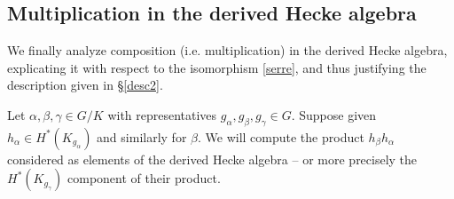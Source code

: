 \documentclass[10pt]{amsart}
\theoremstyle{remark}
\begin{document}
 
 
%
%
%
%
%
%
%
%
%
%

 
 


 
 
 
 
 
  \subsection{Multiplication in the derived Hecke algebra}  \label{sec:mult}
  We finally analyze composition (i.e. multiplication) in the derived Hecke algebra, explicating
  it with respect to the isomorphism \eqref{serre}, and thus justifying the description given in \S \ref{desc2}.  
  
  
 Let $\alpha, \beta, \gamma \in G/K$ with representatives $g_{\alpha}, g_{\beta}, g_{\gamma} \in G$. 
 Suppose given
 $h_{\alpha} \in H^*(K_{g_{\alpha}})$ and similarly for $\beta$.   We will compute  the product $h_{\beta} h_{\alpha}$ considered as elements of the derived Hecke algebra -- or more precisely the $H^*(K_{g_{\gamma}})$ component of their product. 
 
\end{document}
